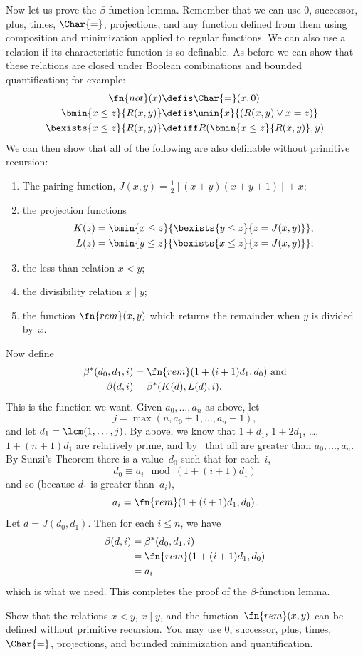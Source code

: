 \documentclass[../../../include/open-logic-section]{subfiles}
\begin{document}
Now let us prove the $\beta$ function lemma. Remember that we can use
$0$, successor, plus, times, $\Char{=}$, projections, and any function
defined from them using composition and minimization applied to
regular functions. We can also use a relation if its characteristic
function is so definable. As before we can show that these relations
are closed under Boolean combinations and bounded quantification; for
example:
\begin{align*}
\fn{not}(x) & \defis \Char{=}(x,0)\\
\bmin{x \leq z}{R(x,y)} & \defis \umin{x}{(R(x,y) \lor x = z)}\\
\bexists{x \leq z}{R(x,y)} & \defiff R(\bmin{x \leq z}{R(x,y)}, y)
\end{align*}
We can then show that all of the following are also definable without
primitive recursion:
\begin{enumerate}
\item The pairing function, $J(x,y) = \frac{1}{2}[(x+y)(x+y+1)] + x$;
\item the projection functions
\begin{align*}
K(z) & = \bmin{x \leq z}{\bexists{y \leq z}{z = J(x,y)}},\\
L(z) & = \bmin{y \leq z}{\bexists{x \leq z}{z = J(x,y)}};
\end{align*}
\item the less-than relation $x < y$;
\item the divisibility relation $x \mid y$;
\item the function $\fn{rem}(x,y)$ which returns the remainder when
  $y$ is divided by~$x$.
\end{enumerate}
Now define
\begin{align*}
\beta^*(d_0,d_1,i) & = \fn{rem}(1+(i+1) d_1,d_0) \text{ and}\\
\beta(d,i) & = \beta^*(K(d),L(d),i).
\end{align*}
This is the function we want. Given $a_0,\dots,a_n$ as above, let
\[
j = \max(n,a_0+1,\dots,a_n+1),
\]
and let $d_1 = \lcm(1,\dots,j)$. By  above,
we know that $1+d_1$, $1+2 d_1$, \dots, $1+(n+1) d_1$ are relatively
prime, and by~ that all are greater than $a_0,\dots,a_n$.
By Sunzi's Theorem there is a value~$d_0$ such that for each~$i$,
\[
d_0 \equiv a_i \mod (1+(i+1)d_1)
\]
and so (because $d_1$ is greater than~$a_i$),
\[
a_i = \fn{rem}(1+(i+1)d_1,d_0).
\]
Let $d = J(d_0,d_1)$. Then for each $i \le n$, we have
\begin{align*}
\beta(d,i) & =  \beta^*(d_0,d_1,i) \\
& =  \fn{rem}(1+(i+1) d_1,d_0) \\
& =  a_i
\end{align*}
which is what we need. This completes the proof of the
$\beta$-function lemma.

\begin{prob}
  Show that the relations $x < y$, $x \mid y$, and the
  function~$\fn{rem}(x,y)$ can be defined without primitive recursion.
  You may use $0$, successor, plus, times, $\Char{=}$, projections,
  and bounded minimization and quantification.
\end{prob}
\end{document}
